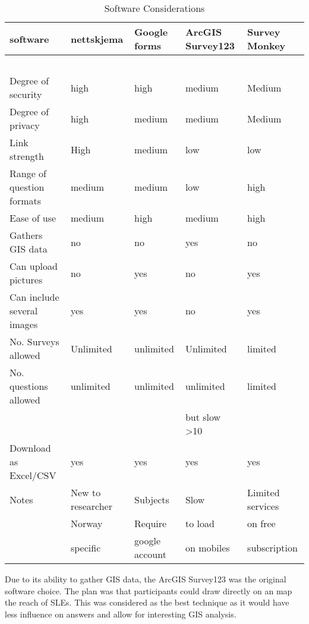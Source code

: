 \begin{table}[h]
    \centering
    \begin{tabular}{|l|l|l|l|l|}
    \hline
        \textbf{software} & \textbf{nettskjema} & \textbf{Google forms} & \textbf{ArcGIS Survey123} & \textbf{Survey Monkey} \\ \hline
        ~ & ~ & ~ & ~ & ~ \\ \hline
        Degree of security & high & high & medium & Medium \\ \hline
        Degree of privacy & high & medium & medium & Medium \\ \hline
        Link strength & High & medium & low & low \\ \hline
        Range of question formats & medium & medium & low & high \\ \hline
        Ease of use & medium & high & medium & high \\ \hline
        Gathers GIS data & no & no & yes & no \\ \hline
        Can upload pictures & no & yes & no & yes \\ \hline
        Can include several images & yes & yes & no & yes \\ \hline
        No. Surveys allowed & Unlimited & unlimited & Unlimited & limited \\ \hline
        No. questions allowed & unlimited & unlimited & unlimited & limited \\ \newline
        &  &  &  but slow >10 &  \\ \hline
        Download as Excel/CSV & yes & yes & yes & yes \\ \hline
        Notes & New to researcher & Subjects  & Slow  & Limited services\\ \newline
         & Norway & Require  & to load  & on free \\ \newline
         & specific & google account & on mobiles & subscription \\ \hline
    \end{tabular}
    \caption{Software Considerations}
    \label{table: software-considerations}
\end{table}

Due to its ability to gather GIS data, the ArcGIS Survey123 was the original software choice. The plan was that participants could draw directly on an map the reach of SLEs. This was considered as the best technique as it would have less influence on answers and allow for interesting GIS analysis. 
